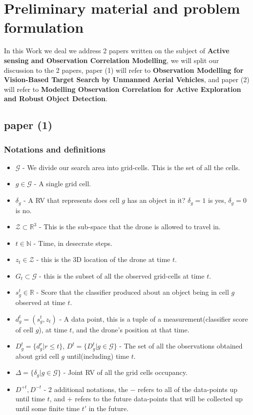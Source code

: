 \documentclass{article}
\begin{document}
	\section{Preliminary material and problem formulation}
	In this Work we deal we address 2 papers written on the subject of \textbf{Active sensing and Observation Correlation Modelling},
	we will split our discussion to the 2 papers, paper (1) will refer to \textbf{Observation Modelling for Vision-Based Target Search by Unmanned Aerial Vehicles}, and paper (2) will refer to \textbf{Modelling Observation Correlation for Active Exploration and Robust Object Detection}.
	\subsection{paper (1)}
	
	\subsubsection{Notations and definitions}
	
	\begin{itemize}
		\item $\mathcal{G}$ - We divide our search area into grid-cells. This is the set of all the cells.
		\item $g \in \mathcal{G}$ - A single grid cell.
		\item $\delta_g$ - A RV that represents does cell $g$ has an object in it? $\delta_g = 1$ is yes, $\delta_g = 0$ is no. 
		\item $\mathcal{Z} \subset \mathbb{R}^3$ - This is the sub-space that the drone is allowed to travel in. 
		\item $t \in \mathbb{N}$ - Time, in desecrate steps.	
		\item $z_t \in \mathcal{Z}$ - this is the 3D location of the drone at time $t$.
		\item $G_t \subset \mathcal{G}$ - this is the subset of all the observed grid-cells at time $t$.
		\item $s_g^t \in \mathbb{R}$ - Score that the classifier produced about an object being in cell $g$ observed at time $t$.   
		\item $d^t_g = (s_g^t, z_t)$ - A data point, this is a tuple of a measurement(classifier score of cell $g$), at time $t$, and the drone's position at that time.
		\item $D_g^t = \{d_g^r|r \leq t\}$, $D^t=\{D_g^t|g\in\mathcal{G}\}$ - The set of all the observations obtained about grid cell $g$ until(including) time $t$. 
		\item $\Delta = \{\delta_g|g\in\mathcal{G}\}$ - Joint RV of all the grid cells occupancy.
		\item $D^{+t},D^{-t}$ - 2 additional notations, the $-$ refers to all of the data-points up until time $t$, and $+$ refers to the future data-points that will be collected up until some finite time $t'$ in the future.
	\end{itemize}
\end{document}
